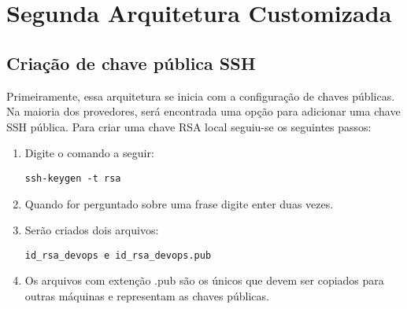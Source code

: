 

 

\section{Segunda Arquitetura Customizada }

\subsection{Criação de chave pública SSH}

Primeiramente, essa arquitetura se inicia com a 
configuração de chaves públicas. Na maioria dos 
provedores, será encontrada uma opção para adicionar 
uma chave SSH pública.
Para criar uma chave RSA local seguiu-se os 
seguintes passos:
 \begin{enumerate}
   \item Digite o comando a seguir:
	
      \begin{lstlisting}
ssh-keygen -t rsa
      \end{lstlisting}
   
   \item Quando for perguntado sobre uma frase digite 
      enter duas vezes.
    \item Serão criados dois arquivos:
    \begin{lstlisting}
id_rsa_devops e id_rsa_devops.pub
    \end{lstlisting}
    
    \item Os arquivos com extenção .pub são os únicos 
	  que devem ser copiados para outras máquinas 
	  e representam as chaves públicas.

 \end{enumerate} 
 
